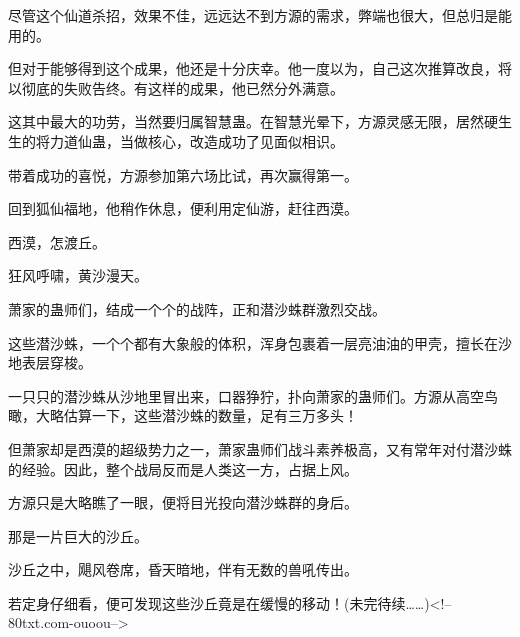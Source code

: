 \begin{this_body}
尽管这个仙道杀招，效果不佳，远远达不到方源的需求，弊端也很大，但总归是能用的。

但对于能够得到这个成果，他还是十分庆幸。他一度以为，自己这次推算改良，将以彻底的失败告终。有这样的成果，他已然分外满意。

这其中最大的功劳，当然要归属智慧蛊。在智慧光晕下，方源灵感无限，居然硬生生的将力道仙蛊，当做核心，改造成功了见面似相识。

带着成功的喜悦，方源参加第六场比试，再次赢得第一。

回到狐仙福地，他稍作休息，便利用定仙游，赶往西漠。

西漠，怎渡丘。

狂风呼啸，黄沙漫天。

萧家的蛊师们，结成一个个的战阵，正和潜沙蛛群激烈交战。

这些潜沙蛛，一个个都有大象般的体积，浑身包裹着一层亮油油的甲壳，擅长在沙地表层穿梭。

一只只的潜沙蛛从沙地里冒出来，口器狰狞，扑向萧家的蛊师们。方源从高空鸟瞰，大略估算一下，这些潜沙蛛的数量，足有三万多头！

但萧家却是西漠的超级势力之一，萧家蛊师们战斗素养极高，又有常年对付潜沙蛛的经验。因此，整个战局反而是人类这一方，占据上风。

方源只是大略瞧了一眼，便将目光投向潜沙蛛群的身后。

那是一片巨大的沙丘。

沙丘之中，飓风卷席，昏天暗地，伴有无数的兽吼传出。

若定身仔细看，便可发现这些沙丘竟是在缓慢的移动！(未完待续……)<!--80txt.com-ouoou-->

\end{this_body}

